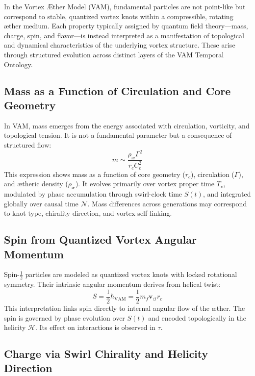 \documentclass[12pt]{article}
\begin{document}
In the Vortex \AE{}ther Model (VAM), fundamental particles are not point-like but correspond to stable, quantized vortex knots within a compressible, rotating \ae{}ther medium. Each property typically assigned by quantum field theory---mass, charge, spin, and flavor---is instead interpreted as a manifestation of topological and dynamical characteristics of the underlying vortex structure. These arise through structured evolution across distinct layers of the VAM Temporal Ontology.

\subsection{Mass as a Function of Circulation and Core Geometry}

In VAM, mass emerges from the energy associated with circulation, vorticity, and topological tension. It is not a fundamental parameter but a consequence of structured flow:
\[
m \sim \frac{\rho_\text{\ae} \Gamma^2}{r_c C_e^2}
\]
This expression shows mass as a function of core geometry ($r_c$), circulation ($\Gamma$), and \ae{}theric density ($\rho_\text{\ae}$). It evolves primarily over vortex proper time $T_v$, modulated by phase accumulation through swirl-clock time $S(t)$, and integrated globally over causal time $\mathcal{N}$. Mass differences across generations may correspond to knot type, chirality direction, and vortex self-linking.

\subsection{Spin from Quantized Vortex Angular Momentum}

Spin-$\tfrac{1}{2}$ particles are modeled as quantized vortex knots with locked rotational symmetry. Their intrinsic angular momentum derives from helical twist:
\begin{equation}
S = \frac{1}{2} \hbar_\text{VAM} = \frac{1}{2} m_f \mathbf{v}_{\scriptscriptstyle\boldsymbol{\circlearrowleft}} r_c
\end{equation}
This interpretation links spin directly to internal angular flow of the \ae{}ther. The spin is governed by phase evolution over $S(t)$ and encoded topologically in the helicity $\mathcal{H}$. Its effect on interactions is observed in $\tau$.

\subsection{Charge via Swirl Chirality and Helicity Direction}
\end{document}
